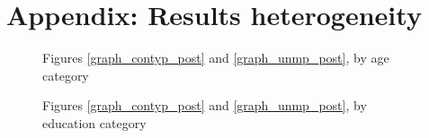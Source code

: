 \documentclass[12pt]{article}
\begin{document}
\section{Appendix: Results heterogeneity}\label{sec:heterogeneity}

\begin{figure}
    \caption{Figures \ref{graph_contyp_post} and \ref{graph_unmp_post}, by age category}
    \label{graph_post_event_age_cat}
\end{figure}

\begin{figure}
    \caption{Figures \ref{graph_contyp_post} and \ref{graph_unmp_post}, by education category}
    \label{graph_post_event_edu_cat}
\end{figure}
\end{document}
